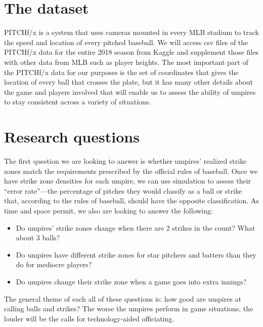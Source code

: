 \documentclass[bj, preprint]{imsart}
\begin{document}
\section{The dataset}\label{sec:dataset}
PITCHf/x is a system that uses cameras mounted in every MLB stadium to track the speed and location of every pitched baseball. 
We will access csv files of the PITCHf/x data for the entire 2018 season from Kaggle \citep{schale2019mlb} and supplement those files with other data from MLB such as player heights. 
The most important part of the PITCHf/x data for our purposes is the set of coordinates that gives the location of every ball that crosses the plate, but it has many other details about the game and players involved that will enable us to assess the ability of umpires to stay consistent across a variety of situations.

\section{Research questions}\label{sec:research}
The first question we are looking to answer is whether umpires' realized strike zones match the requirements prescribed by the official rules of baseball. 
Once we have strike zone densities for each umpire, we can use simulation to assess their ``error rate''---the percentage of pitches they would classify as a ball or strike that, according to the rules of baseball, should have the opposite classification.
As time and space permit, we also are looking to answer the following:
\begin{itemize}
\item Do umpires' strike zones change when there are 2 strikes in the count? What about 3 balls?
\item Do umpires have different strike zones for star pitchers and batters than they do for mediocre players?
\item Do umpires change their strike zone when a game goes into extra innings?
\end{itemize}
The general theme of each all of these questions is: how good are umpires at calling balls and strikes? 
The worse the umpires perform in game situations, the louder will be the calls for technology-aided officiating.
\end{document}
